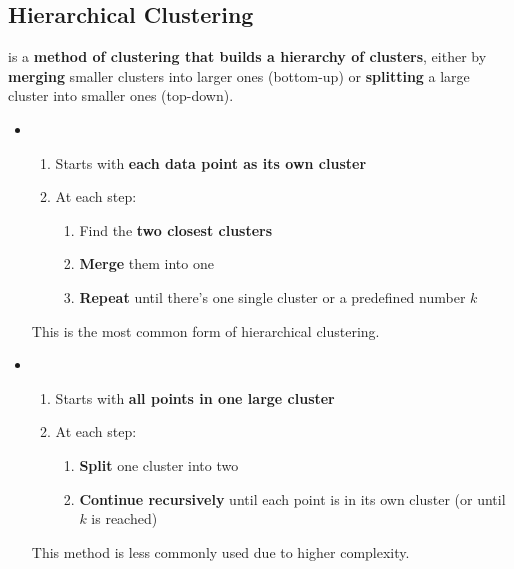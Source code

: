 \subsection{Hierarchical Clustering}

 is a \textbf{method of clustering that builds a hierarchy of clusters}, either by \textbf{merging} smaller clusters into larger ones (bottom-up) or \textbf{splitting} a large cluster into smaller ones (top-down).
\begin{itemize}
    \item {}
    \begin{enumerate}
        \item Starts with \textbf{each data point as its own cluster}
        \item At each step:
        \begin{enumerate}
            \item Find the \textbf{two closest clusters}
            \item \textbf{Merge} them into one
            \item \textbf{Repeat} until there's one single cluster or a predefined number $k$
        \end{enumerate}
    \end{enumerate}
    This is the most common form of hierarchical clustering.
    
    \item {}
    \begin{enumerate}
        \item Starts with \textbf{all points in one large cluster}
        \item At each step:
        \begin{enumerate}
            \item \textbf{Split} one cluster into two
            \item \textbf{Continue recursively} until each point is in its own cluster (or until $k$ is reached)
        \end{enumerate}
    \end{enumerate}
    This method is less commonly used due to higher complexity.
\end{itemize}


